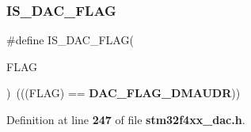 \subsubsection{I\+S\+\_\+\+D\+A\+C\+\_\+\+F\+L\+AG}
{\footnotesize\ttfamily \#define I\+S\+\_\+\+D\+A\+C\+\_\+\+F\+L\+AG(\begin{DoxyParamCaption}\item[{}]{F\+L\+AG }\end{DoxyParamCaption})~(((F\+L\+AG) == \textbf{ D\+A\+C\+\_\+\+F\+L\+A\+G\+\_\+\+D\+M\+A\+U\+DR}))}



Definition at line \textbf{ 247} of file \textbf{ stm32f4xx\+\_\+dac.\+h}.

